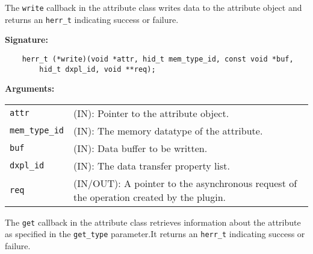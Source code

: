 The \texttt{write} callback in the attribute class writes data to
the attribute object and returns an \texttt{herr\_t} indicating success or
failure.\bigskip

\begin{mdframed}[style=bgbox]
\textbf{Signature:}
\begin{lstlisting}
    herr_t (*write)(void *attr, hid_t mem_type_id, const void *buf, 
        hid_t dxpl_id, void **req);
\end{lstlisting}

\textbf{Arguments:}\\
\begin{tabular}{l p{13.5cm}}
  \texttt{attr} & (IN): Pointer to the attribute object.\\
  \texttt{mem\_type\_id} & (IN): The memory datatype of the attribute.\\
  \texttt{buf} & (IN): Data buffer to be written.\\
  \texttt{dxpl\_id} & (IN): The data transfer property list.\\
  \texttt{req} & (IN/OUT): A pointer to the asynchronous request of the
  operation created by the plugin.\\
\end{tabular}
\end{mdframed}

The \texttt{get} callback in the attribute class retrieves
information about the attribute as specified in the \texttt{get\_type}
parameter.It returns an \texttt{herr\_t} indicating success or failure.\bigskip

